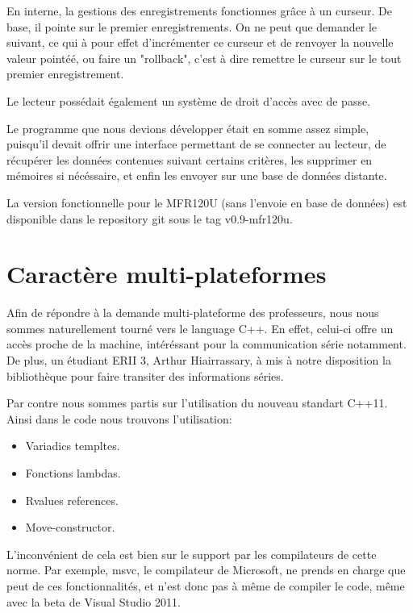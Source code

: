     En interne, la gestions des enregistrements fonctionnes grâce à un curseur.
De base, il pointe sur le premier enregistrements. On ne peut que demander le suivant,
ce qui à pour effet d'incrémenter ce curseur et de renvoyer la nouvelle valeur
pointéé, ou faire un "rollback", c'est à dire remettre le curseur sur le tout
premier enregistrement.

    Le lecteur possédait également un système de droit d'accès avec de passe.

    Le programme que nous devions développer était en somme assez simple, puisqu'il
devait offrir une interface permettant de se connecter au lecteur, de récupérer les
données contenues suivant certains critères, les supprimer en mémoires si nécéssaire,
et enfin les envoyer sur une base de données distante.

    La version fonctionnelle pour le MFR120U (sans l'envoie en base de données)
est disponible dans le repository git sous le tag v0.9-mfr120u.



\section{Caractère multi-plateformes}
    Afin de répondre à la demande multi-plateforme des professeurs, nous nous 
sommes naturellement tourné vers le language C++. En effet, celui-ci offre un accès
proche de la machine, intéréssant pour la communication série notamment. De plus,
un étudiant ERII 3, Arthur Hiairrassary, à mis à notre disposition la bibliothèque
pour faire transiter des informations séries.

    Par contre nous sommes partis sur l'utilisation du nouveau standart C++11. Ainsi
dans le code nous trouvons l'utilisation:

    \begin{itemize}
        \item Variadics templtes.
        \item Fonctions lambdas.
        \item Rvalues references.
        \item Move-constructor.
    \end{itemize}

    L'inconvénient de cela est bien sur le support par les compilateurs de cette
norme. Par exemple, msvc, le compilateur de Microsoft, ne prends en charge que peut
de ces fonctionnalités, et n'est donc pas à même de compiler le code, même avec la
beta de Visual Studio 2011.

